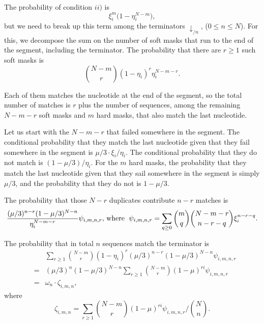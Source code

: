 \documentclass{article}
\begin{document}
The probability of condition $ii)$ is
\begin{equation*}
\xi_i^m \Big(1 - \eta_i^{N-m} \Big),
\end{equation*}
but we need to break up this term among the terminators $\downarrow_{/n}$,
($0 \leq n \leq N$). For this, we decompose the sum on the number of soft
masks that run to the end of the segment, including the terminator. The
probability that there are $r \geq 1$ such soft masks is
\begin{equation*}
{N-m \choose r} (1 - \eta_i)^r \eta_i^{N-m-r}.
\end{equation*}

Each of them matches the nucleotide at the end of the segment, so the
total number of matches is $r$ plus the number of sequences, among the
remaining $N-m-r$ soft masks and $m$ hard masks, that also match the
last nucleotide.

Let us start with the $N-m-r$ that failed somewhere in the segment. The
conditional probability that they match the last nucleotide given that
they fail somewhere in the segment is $\mu/3 \cdot \xi_i / \eta_i$. The
conditional probability that they do not match is $(1-\mu/3) / \eta_i$.
For the $m$ hard masks, the probability that they match the last
nucleotide given that they sail somewhere in the segment is simply
$\mu/3$, and the probability that they do not is $1-\mu/3$.

The probability that those $N-r$ duplicates contribute $n-r$ matches is
\begin{equation*}
\frac{(\mu/3)^{n-r}(1-\mu/3)^{N-n}}{\eta_i^{N-m-r}}
\psi_{i,m,n,r}\text{, where \;}
\psi_{i,m,n,r} = \sum_{q \geq 0}{m \choose q}{N-m-r \choose n-r-q}
\xi_i^{n-r-q}.
\end{equation*}


The probability that in
total $n$ sequences match the terminator is
\begin{eqnarray*}
&\;& \sum_{r\geq1} {N-m \choose r}
(1 - \eta_i)^r (\mu/3)^{n-r} (1-\mu/3)^{N-n} \psi_{i,m,n,r} \\
&=& (\mu/3)^n(1-\mu/3)^{N-n} \sum_{r\geq1} {N-m \choose r}
  (1 - \mu)^{ri} \psi_{i,m,n,r} \\
&=& \omega_n \cdot \zeta_{i,m,n},
\end{eqnarray*}
where
\begin{equation}
\label{eq:zeta}
\zeta_{i,m,n} = \sum_{r\geq1} {N-m \choose r}
(1-\mu)^{ri} \psi_{i,m,n,r} \bigg/ {N \choose n}.
\end{equation}
\end{document}
